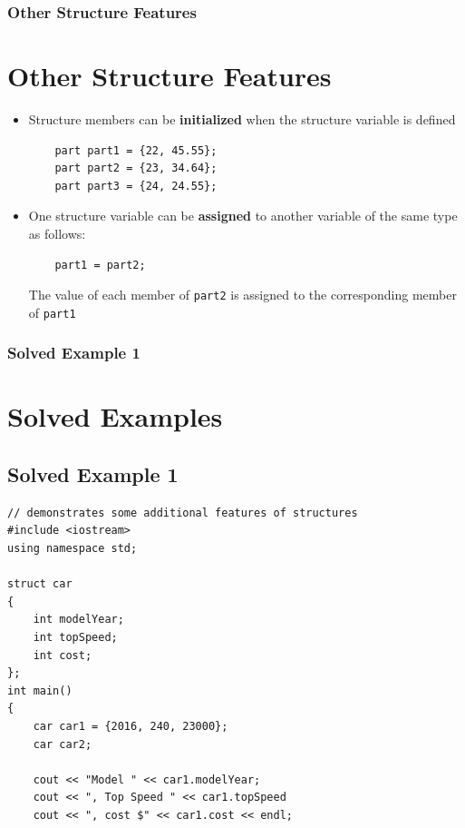 \documentclass{beamer}
\begin{document}
\begin{frame} [fragile]
\frametitle{Other Structure Features}
\section{Other Structure Features} %
\label{sec:other_structure_features}
    \begin{itemize}
        \item Structure members can be \textbf{initialized} when the structure variable is defined
        \lstset{style=mystyle}
\begin{lstlisting}
    part part1 = {22, 45.55};
    part part2 = {23, 34.64};
    part part3 = {24, 24.55};

\end{lstlisting}
        \item One structure variable can be \textbf{assigned} to another variable of the same type as follows:
        \lstset{style=mystyle}
\begin{lstlisting}
    part1 = part2;

\end{lstlisting}
The value of each member of \texttt{part2} is assigned to the corresponding member of \texttt{part1}
    \end{itemize}
\end{frame}

\begin{frame} [fragile]
    \frametitle{Solved Example 1}
    \section{Solved Examples} %
    \label{sec:solved_examples}
    \subsection{Solved Example 1} %
    \label{sub:solved_example_1}
    \lstset{style=mystyle}
\begin{lstlisting}
// demonstrates some additional features of structures
#include <iostream>
using namespace std;

struct car
{
    int modelYear;
    int topSpeed;
    int cost;
};
int main()
{
    car car1 = {2016, 240, 23000};
    car car2;

    cout << "Model " << car1.modelYear;
    cout << ", Top Speed " << car1.topSpeed
    cout << ", cost $" << car1.cost << endl;

\end{lstlisting}
\end{frame}
\end{document}
